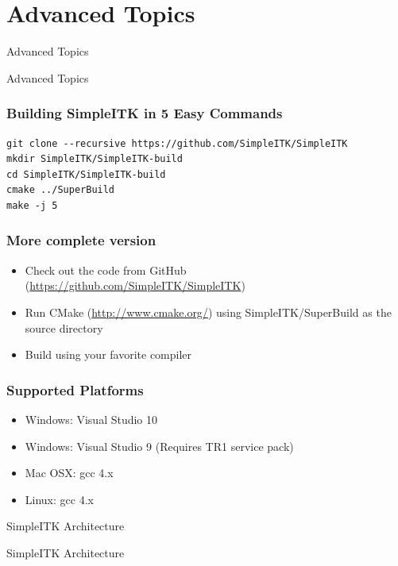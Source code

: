 \section{Advanced Topics}
\begin{frame}{Advanced Topics}
\fontsize{36pt}{36pt}\selectfont
\center
\begin{center}
Advanced Topics
\end{center}
\end{frame}

\begin{frame}[fragile]
\frametitle{Building SimpleITK in 5 Easy Commands}
\small
\begin{verbatim}
git clone --recursive https://github.com/SimpleITK/SimpleITK
mkdir SimpleITK/SimpleITK-build
cd SimpleITK/SimpleITK-build
cmake ../SuperBuild
make -j 5
\end{verbatim}
\normalsize
\end{frame}

\begin{frame}[fragile]
\frametitle{More complete version}
\begin{itemize}
  \item Check out the code from GitHub (\url{https://github.com/SimpleITK/SimpleITK})
  \item Run CMake (\url{http://www.cmake.org/}) using SimpleITK/SuperBuild as the source directory
  \item Build using your favorite compiler
\end{itemize}
\end{frame}

\begin{frame}[fragile]
\frametitle{Supported Platforms}
\begin{itemize}
  \item Windows: Visual Studio 10
  \item Windows: Visual Studio 9 (Requires TR1 service pack)
  \item Mac OSX: gcc 4.x
  \item Linux: gcc 4.x
\end{itemize}
\end{frame}

\begin{frame}{SimpleITK Architecture}
\fontsize{36pt}{36pt}\selectfont
\center
\begin{center}
SimpleITK Architecture
\end{center}
\end{frame}

